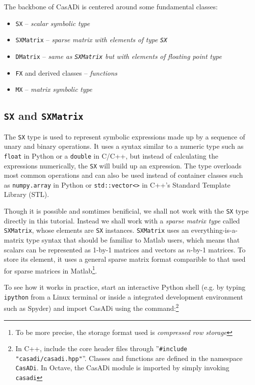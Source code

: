 \documentclass[a4paper,12pt]{book}
\begin{document}
{The backbone of CasADi is centered around some fundamental classes:
\begin{itemize}
 \item \texttt{SX} -- \emph{scalar symbolic type}
 \item \texttt{SXMatrix} -- \emph{sparse matrix with elements of type \texttt{SX}}
 \item \texttt{DMatrix}  -- \emph{same as \texttt{SXMatrix} but with elements of floating point type}
 \item \texttt{FX} and derived classes -- \emph{functions}
 \item \texttt{MX} -- \emph{matrix symbolic type}
\end{itemize}

\subsection{\texttt{SX} and \texttt{SXMatrix}}
The \texttt{SX} type is used to represent symbolic expressions made up by a sequence of unary and binary operations. It uses a syntax similar to a numeric type such as \texttt{float} in Python or a \texttt{double} in C/C++, but instead of calculating the expressions numerically, the \texttt{SX} will build up an expression. The type overloads most common operations and can also be used instead of container classes such as \texttt{numpy.array} in Python or \texttt{std::vector<>} in C++'s Standard Template Library (STL).

Though it is possible and somtimes benificial, we shall not work with the \texttt{SX} type directly in this tutorial. Instead we shall work with a \emph{sparse matrix type} called \texttt{SXMatrix}, whose elements are \texttt{SX} instances. \texttt{SXMatrix} uses an everything-is-a-matrix type syntax that should be familiar to Matlab users, which means that scalars can be represented as 1-by-1 matrices and vectors as $n$-by-1 matrices. To store its element, it uses a general sparse matrix format comparible to that used for sparse matrices in Matlab\footnote{To be more precise, the storage format used is \emph{compressed row storage}}.

To see how it works in practice, start an interactive Python shell (e.g. by typing \texttt{ipython} from a Linux terminal or inside a integrated development environment such as Spyder) and import CasADi using the command:\footnote{In C++, include the core header files through ''\texttt{\#include "casadi/casadi.hpp"}''. Classes and functions are defined in the namespace \texttt{CasADi}. In Octave, the CasADi module is imported by simply invoking \texttt{casadi}}

}
\end{document}
